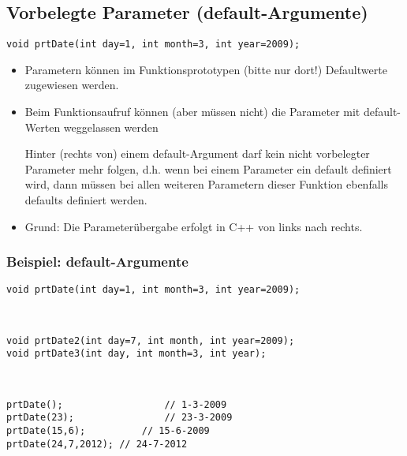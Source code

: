 \subsection{Vorbelegte Parameter (default-Argumente)}
\begin{minipage}{0.65\linewidth}
\begin{lstlisting}
void prtDate(int day=1, int month=3, int year=2009);
\end{lstlisting}
\end{minipage}
\normalsize
\begin{itemize}
	\item Parametern können im Funktionsprototypen (\color{red}bitte nur dort!\color{black}) Defaultwerte zugewiesen werden.
	\item Beim Funktionsaufruf können (aber müssen nicht) die Parameter mit default-Werten weggelassen werden\\
	\begin{achtung}Hinter (rechts von) einem default-Argument darf kein nicht vorbelegter Parameter mehr folgen, d.h. wenn bei einem Parameter ein default definiert wird, dann müssen bei allen weiteren Parametern dieser Funktion ebenfalls defaults definiert werden.
	\end{achtung}
	\item Grund: Die Parameterübergabe erfolgt in C++ von links nach rechts.
\end{itemize}

\subsubsection{Beispiel: default-Argumente}
\noindent
\begin{minipage}{\linewidth}
\begin{lstlisting}
void prtDate(int day=1, int month=3, int year=2009);
\end{lstlisting}
\end{minipage}
\\
\begin{minipage}{0.65\linewidth}
\begin{lstlisting}
void prtDate2(int day=7, int month, int year=2009);
void prtDate3(int day, int month=3, int year);
\end{lstlisting}
\end{minipage}

\\
\begin{minipage}{0.4\linewidth}
\begin{lstlisting}
prtDate();					// 1-3-2009
prtDate(23);				// 23-3-2009
prtDate(15,6);			// 15-6-2009
prtDate(24,7,2012);	// 24-7-2012
\end{lstlisting}
\end{minipage}

